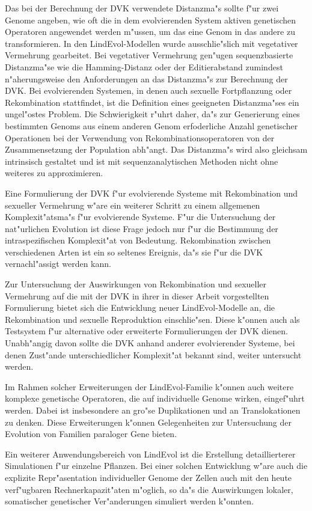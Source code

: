 Das bei der Berechnung der DVK verwendete Distanzma"s sollte f"ur zwei Genome angeben,
wie oft die in dem evolvierenden System aktiven genetischen Operatoren angewendet werden m"ussen,
um das eine Genom in das andere zu transformieren. In den LindEvol-Modellen wurde ausschlie"slich
mit vegetativer Vermehrung gearbeitet. Bei vegetativer Vermehrung gen"ugen sequenzbasierte Distanzma"se wie die Hamming-Distanz
oder der Editierabstand zumindest n"aherungsweise den Anforderungen an das Distanzma"s zur
Berechnung der DVK. Bei evolvierenden Systemen, in denen auch sexuelle Fortpflanzung oder
Rekombination stattfindet, ist die Definition eines geeigneten Distanzma"ses ein ungel"ostes
Problem. Die Schwierigkeit r"uhrt daher, da"s zur Generierung eines bestimmten Genoms aus einem
anderen Genom erfoderliche Anzahl genetischer Operationen bei der Verwendung von Rekombinationsoperatoren
von der Zusammensetzung der Population abh"angt. Das Distanzma"s wird also gleichsam intrinsisch
gestaltet und ist mit sequenzanalytischen Methoden nicht ohne weiteres zu approximieren.

Eine Formulierung der DVK f"ur evolvierende Systeme mit Rekombination und sexueller Vermehrung
w"are ein weiterer Schritt zu einem allgemenen Komplexit"atsma"s f"ur evolvierende Systeme.
F"ur die Untersuchung der nat"urlichen Evolution ist diese Frage jedoch nur f"ur die Bestimmung
der intraspezifischen Komplexit"at von Bedeutung. Rekombination zwischen verschiedenen Arten
ist ein so seltenes Ereignis, da"s sie f"ur die DVK vernachl"assigt werden kann.

Zur Untersuchung der Auswirkungen von Rekombination und sexueller Vermehrung auf die mit der DVK in ihrer
in dieser Arbeit vorgestellten Formulierung bietet sich die Entwicklung neuer
LindEvol-Modelle an, die Rekombination und sexuelle Reproduktion einschlie"sen.
Diese k"onnen auch als Testsystem f"ur alternative oder erweiterte
Formulierungen der DVK dienen. Unabh"angig davon sollte die DVK anhand anderer evolvierender
Systeme, bei denen Zust"ande unterschiedlicher Komplexit"at bekannt sind, weiter untersucht werden.

Im Rahmen solcher Erweiterungen der LindEvol-Familie k"onnen auch weitere komplexe genetische
Operatoren, die auf individuelle Genome wirken, eingef"uhrt werden. Dabei ist insbesondere an
gro"se Duplikationen und an Translokationen zu denken. Diese Erweiterungen k"onnen Gelegenheiten
zur Untersuchung der Evolution von Familien paraloger Gene bieten.

Ein weiterer Anwendungsbereich von LindEvol ist die Erstellung detaillierterer Simulationen f"ur einzelne
Pflanzen. Bei einer solchen Entwicklung w"are auch die explizite Repr"asentation individueller Genome
der Zellen auch mit den heute verf"ugbaren Rechnerkapazit"aten m"oglich, so da"s die Auswirkungen lokaler,
somatischer genetischer Ver"anderungen simuliert werden k"onnten.


